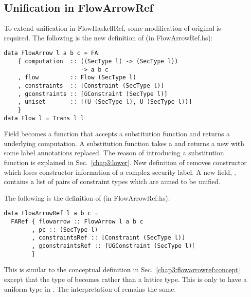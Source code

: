 \subsection{Unification in FlowArrowRef}
\label{chap3:unification:flowarrowref}
To extend unification in FlowHaskellRef, some modification of original 
is required. The following is the new definition of (in FlowArrowRef.hs):
\begin{verbatim}
data FlowArrow l a b c = FA
    { computation  :: ((SecType l) -> (SecType l)) 
                      -> a b c
    , flow         :: Flow (SecType l)
    , constraints  :: [Constraint (SecType l)]
    , gconstraints :: [GConstraint (SecType l)]
    , uniset       :: [(U (SecType l), U (SecType l))]
    }
data Flow l = Trans l l 
\end{verbatim}
Field  becomes a function that accepts a substitution function and returns a underlying
computation. A substitution function takes a  and returns a new  with some 
label annotations replaced.
The reason of introducing a substitution function is explained in Sec.~\ref{chap3:lower}.
New definition of  removes constructor  which loses constructor information of a complex
security label. A new field, , contains a list of pairs of constraint types which are aimed 
to be unified.

The following is the definition of (in FlowArrowRef.hs):
\begin{verbatim}
data FlowArrowRef l a b c = 
  FARef { flowarrow :: FlowArrow l a b c
        , pc :: (SecType l)
        , constraintsRef :: [Constraint (SecType l)]
        , gconstraintsRef :: [UGConstraint (SecType l)]
        }
\end{verbatim}
This is similar to the conceptual definition in Sec.~\ref{chap3:flowarrowref:concept} except that 
the type of  becomes  rather than a lattice type. This is only to have a uniform
type in . The interpretation of  remains the same.

